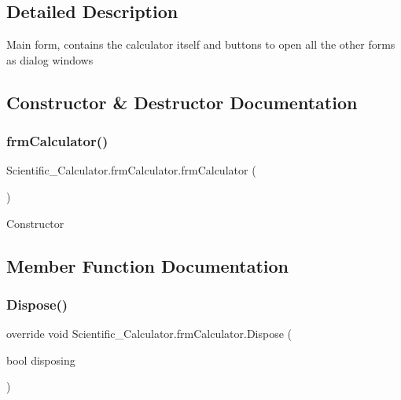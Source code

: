 \subsection{Detailed Description}
Main form, contains the calculator itself and buttons to open all the other forms as dialog windows 



\subsection{Constructor \& Destructor Documentation}
\mbox{\label{class_scientific___calculator_1_1frm_calculator_a0959073ecdf7a5b1f1bee0b47a56cee9}} 
\subsubsection{\texorpdfstring{frm\+Calculator()}{frmCalculator()}}
{\footnotesize\ttfamily Scientific\+\_\+\+Calculator.\+frm\+Calculator.\+frm\+Calculator (\begin{DoxyParamCaption}{ }\end{DoxyParamCaption})}



Constructor 



\subsection{Member Function Documentation}
\mbox{\label{class_scientific___calculator_1_1frm_calculator_a3839d5570f4cf4bf018fbed788f93823}} 
\subsubsection{\texorpdfstring{Dispose()}{Dispose()}}
{\footnotesize\ttfamily override void Scientific\+\_\+\+Calculator.\+frm\+Calculator.\+Dispose (\begin{DoxyParamCaption}\item[{bool}]{disposing }\end{DoxyParamCaption})\hspace{0.3cm}{\ttfamily [protected]}}



